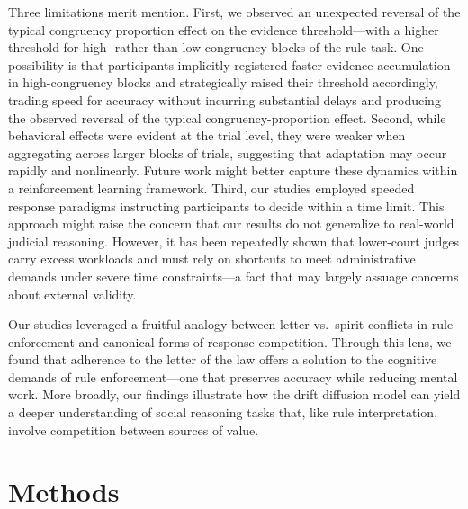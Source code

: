 \documentclass[pdflatex,sn-nature]{sn-jnl}
\begin{document}
Three limitations merit mention. First, we observed an unexpected reversal of the typical congruency proportion effect on the evidence threshold---with a higher threshold for high- rather than low-congruency blocks of the rule task. One possibility is that participants implicitly registered faster evidence accumulation in high-congruency blocks and strategically raised their threshold accordingly, trading speed for accuracy without incurring substantial delays and producing the observed reversal of the typical congruency-proportion effect. Second, while behavioral effects were evident at the trial level, they were weaker when aggregating across larger blocks of trials, suggesting that adaptation may occur rapidly and nonlinearly. Future work might better capture these dynamics within a reinforcement learning framework. Third, our studies employed speeded response paradigms instructing participants to decide within a time limit. This approach might raise the concern that our results do not generalize to real-world judicial reasoning. However, it has been repeatedly shown that lower-court judges carry excess workloads and must rely on shortcuts to meet administrative demands under severe time constraints\cite{ref42,ref43,ref44,ref45}---a fact that may largely assuage concerns about external validity.

Our studies leveraged a fruitful analogy between letter vs.\ spirit conflicts in rule enforcement and canonical forms of response competition. Through this lens, we found that adherence to the letter of the law offers a solution to the cognitive demands of rule enforcement---one that preserves accuracy while reducing mental work\cite{ref46,ref47}. More broadly, our findings illustrate how the drift diffusion model can yield a deeper understanding of social reasoning tasks that, like rule interpretation, involve competition between sources of value.

\section{Methods}\label{sec:methods}
\end{document}
